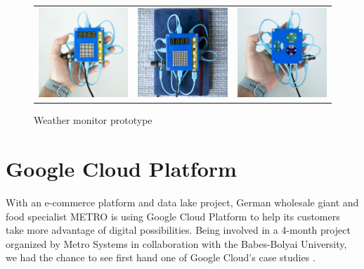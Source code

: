\begin{figure}[!htb]
    \centering
    \begin{tabular}{ccc}
        \includegraphics[width=4.8cm]{figures/FRO_3149} &
        \includegraphics[width=4.8cm]{figures/FRO_3155} &
        \includegraphics[width=4.8cm]{figures/FRO_3151}
    \end{tabular}
    \caption{Weather monitor prototype}
    \label{fig:marker}
\end{figure}

\section{Google Cloud Platform}

With an e-commerce platform and data lake project, German wholesale giant and food specialist METRO is using Google Cloud Platform to help its customers take more advantage of digital possibilities. Being involved in a 4-month project organized by Metro Systems in collaboration with the Babes-Bolyai University, we had the chance to see first hand one of Google Cloud's case studies \cite{googleCloudUseCase}.

